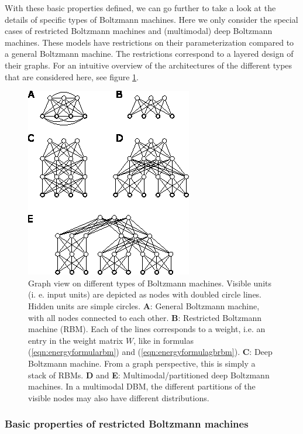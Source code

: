 \documentclass[12pt]{article}
\begin{document}
With these basic properties defined, we can go further to take a look at the details of specific types of Boltzmann machines.
Here we only consider the special cases of restricted Boltzmann machines and (multimodal) deep Boltzmann machines.
These models have restrictions on their parameterization compared to a general Boltzmann machine.
The restrictions correspond to a layered design of their graphs.
For an intuitive overview of the architectures of the different types that are considered here, see figure \ref{fig:bmsoverview}.

\begin{figure}[h]

   \centering
   \includegraphics[scale=3.]{images/BMsOverview.eps}
   \caption{Graph view on different types of Boltzmann machines. Visible units (i. e. input units) are depicted as nodes with doubled circle lines. Hidden units are simple circles.
 {\bf A}: General Boltzmann machine, with all nodes connected to each other. {\bf B}: Restricted Boltzmann machine (RBM). Each of the lines corresponds to a weight, i.e. an entry in the weight matrix $W$, like in formulas (\ref{eqn:energyformularbm}) and (\ref{eqn:energyformulagbrbm}).  
{\bf C}: Deep Boltzmann machine. From a graph perspective, this is simply a stack of RBMs.
{\bf D} and {\bf E}: Multimodal/partitioned deep Boltzmann machines. In a multimodal DBM, the different partitions of the visible nodes may also have different distributions.}
   \label{fig:bmsoverview}
 \end{figure}


\subsubsection{Basic properties of restricted Boltzmann machines}\label{rbmtypes}
\end{document}
